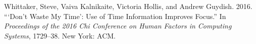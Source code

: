 \leavevmode\hypertarget{ref-Whittaker2016-time-info}{}%
Whittaker, Steve, Vaiva Kalnikaite, Victoria Hollis, and Andrew Guydish.
2016. ```Don't Waste My Time': Use of Time Information Improves Focus.''
In \emph{Proceedings of the 2016 Chi Conference on Human Factors in
Computing Systems}, 1729--38. New York: ACM.



%



